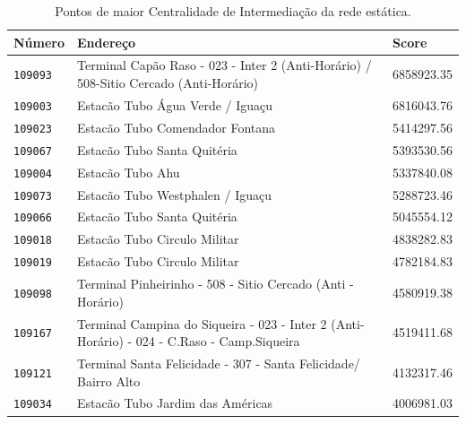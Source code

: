 \begin{table}[htb]
    \caption{Pontos de maior Centralidade de Intermediação da rede estática.}
    \label{tab:centralidade-grau-rede-estatica}
    \centering
    \footnotesize
    \begin{tabular}{p{1.0cm}p{9.0cm}p{3.0cm} } 
        \hline
        Número & Endereço & Score \\
        \hline
        \texttt{109093} &       Terminal Capão Raso - 023 - Inter 2 (Anti-Horário) / 508-Sitio Cercado (Anti-Horário)  & 6858923.35 \\
        \texttt{109003} &                                                            Estacão Tubo Água Verde / Iguaçu  & 6816043.76 \\
        \texttt{109023} &                                                             Estacão Tubo Comendador Fontana  & 5414297.56 \\
        \texttt{109067} &                                                                 Estacão Tubo Santa Quitéria  & 5393530.56 \\
        \texttt{109004} &                                                                            Estacão Tubo Ahu  & 5337840.08 \\
        \texttt{109073} &                                                            Estacão Tubo Westphalen / Iguaçu  & 5288723.46 \\
        \texttt{109066} &                                                                 Estacão Tubo Santa Quitéria  & 5045554.12 \\
        \texttt{109018} &                                                                Estacão Tubo Circulo Militar  & 4838282.83 \\
        \texttt{109019} &                                                                Estacão Tubo Circulo Militar  & 4782184.83 \\
        \texttt{109098} &                                 Terminal Pinheirinho - 508 - Sitio Cercado (Anti - Horário)  & 4580919.38 \\
        \texttt{109167} &  Terminal Campina do Siqueira - 023 - Inter 2 (Anti-Horário) - 024 - C.Raso - Camp.Siqueira  & 4519411.68 \\
        \texttt{109121} &                             Terminal Santa Felicidade - 307 - Santa Felicidade/ Bairro Alto  & 4132317.46 \\
        \texttt{109034} &                                                            Estacão Tubo Jardim das Américas  & 4006981.03 \\

\end{tabular}
\end{table}

